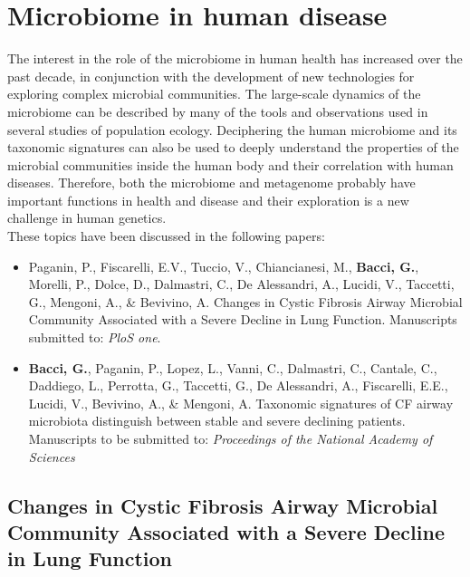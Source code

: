 \logvartrue
\chapter{Microbiome in human disease}
The interest in the role of the microbiome in human health has increased over the past decade, in conjunction with the development of new technologies for exploring complex microbial communities. The large-scale dynamics of the microbiome can be described by many of the tools and observations used in several studies of population ecology. Deciphering the human microbiome and its taxonomic signatures can also be used to deeply understand the properties of the microbial communities inside the human body and their correlation with human diseases. Therefore, both the microbiome and metagenome probably have important functions in health and disease and their exploration is a new challenge in human genetics.\\
These topics have been discussed in the following papers:
\vspace{-2mm}
\begin{itemize}
\item Paganin, P., Fiscarelli, E.V., Tuccio, V., Chiancianesi, M., \textbf{Bacci, G.}, Morelli, P., Dolce, D., Dalmastri, C., De Alessandri, A., Lucidi, V., Taccetti, G., Mengoni, A., \& Bevivino, A. Changes in Cystic Fibrosis Airway Microbial Community Associated with a Severe Decline in Lung Function. Manuscripts submitted to: \textit{PloS one}.
\item \textbf{Bacci, G.}, Paganin, P., Lopez, L., Vanni, C., Dalmastri, C., Cantale, C., Daddiego, L., Perrotta, G., Taccetti, G., De Alessandri, A., Fiscarelli, E.E., Lucidi, V., Bevivino, A., \& Mengoni, A. Taxonomic signatures of CF airway microbiota distinguish between stable and severe declining patients. Manuscripts to be  submitted to: \textit{Proceedings of the National Academy of Sciences}
\end{itemize}

\section[Changes in Cystic Fibrosis Airway Microbial Community Associated with a Severe Decline in Lung Function]{Changes in Cystic Fibrosis Airway Microbial Community Associated with a Severe Decline in Lung Function%
}

